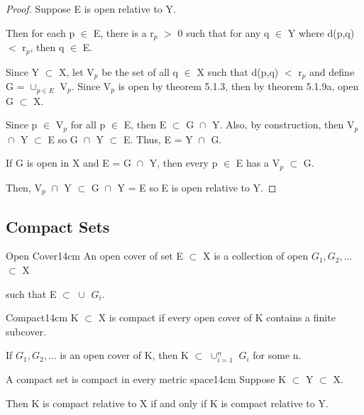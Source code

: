 	\begin{proof}
		Suppose E is open relative to Y.

		Then for each p $\in$ E, there is a r$_p$ $>$ 0 such that for
		any q $\in$ Y where d(p,q) $<$ r$_p$, then q $\in$ E.
		
		Since Y $\subset$ X, let V$_p$ be the set of all q $\in$ X
		such that d(p,q) $<$ r$_p$ and define G = $\cup_{p \in E}^{}$ V$_p$.
		Since V$_p$ is open by {\color{red} theorem 5.1.3}, then by
		{\color{red} theorem 5.1.9a}, open G $\subset$ X.

		Since p $\in$ V$_p$ for all p $\in$ E, then E $\subset$ G $\cap_{}^{}$ Y.
		Also, by construction, then V$_p$ $\cap_{}^{}$ Y $\subset$ E so
		G $\cap_{}^{}$ Y $\subset$ E.
		Thus, E = Y $\cap_{}^{}$ G.

		If G is open in X and E = G $\cap_{}^{}$ Y, then every p $\in$ E has
		a V$_p$ $\subset$ G.

		Then, V$_p$ $\cap_{}^{}$ Y $\subset$ G $\cap_{}^{}$ Y = E so
		E is open relative to Y.
	\end{proof}

	\vspace{0.3cm}

	



\subsection{ Compact Sets }

	\begin{definition}{Open Cover}{14cm}
		An open cover of set E $\subset$ X is a collection of open $G_1, G_2, ...$
		$\subset$ X
		
		such that E $\subset$ $\cup_{}^{}$ $G_i$.
	\end{definition}
	
	\vspace{0.5cm}



	\begin{definition}{Compact}{14cm}
		K $\subset$ X is compact if every open cover
		of K contains a finite subcover.

		\qquad If $G_1, G_2, ...$ is an open cover of K, then
		K $\subset$ $\cup_{i=1}^{n}$ $G_i$ for some n.
	\end{definition}
	
	\vspace{0.5cm}



	\begin{wtheorem}{A compact set is compact in every metric space}{14cm}
		Suppose K $\subset$ Y $\subset$ X.

		Then K is compact relative to X if and only if K is
		compact relative to Y.
	\end{wtheorem}
	
